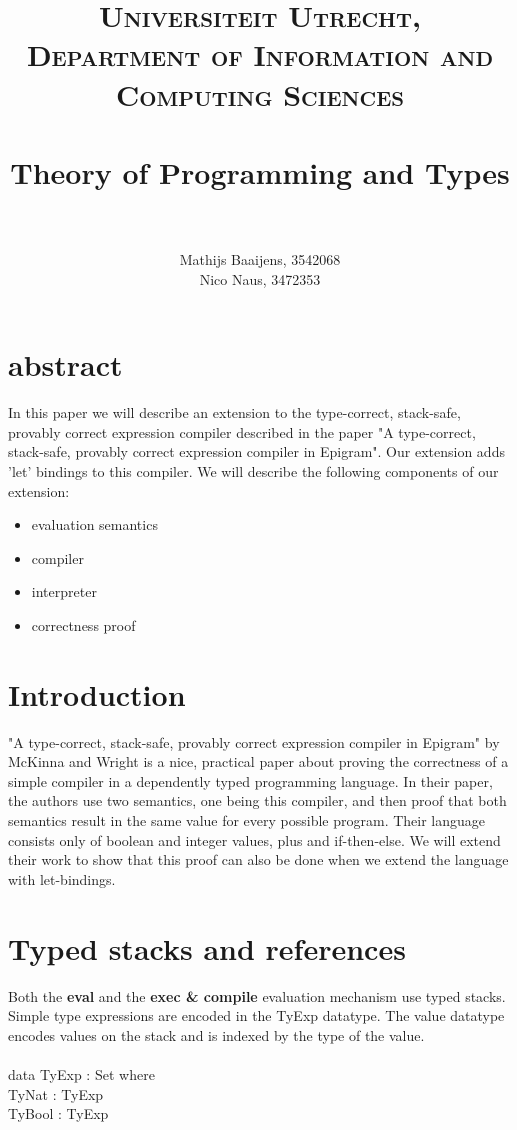 \documentclass[paper=a4, fontsize=11pt]{scrartcl} %
\title{ 
\normalfont \normalsize 
\textsc{Universiteit Utrecht, Department of Information and Computing Sciences} \\ [25pt] %
\horrule{0.5pt} \\[0.4cm] %
\huge Theory of Programming and Types\\ %
\horrule{2pt} \\[0.5cm] %
}
\author{Mathijs Baaijens, 3542068 \\ Nico Naus, 3472353} %
\numberwithin{equation}{section} %
\numberwithin{figure}{section} %
\numberwithin{table}{section} %
\begin{document}
\maketitle %


\section{abstract}
In this paper we will describe an extension to the type-correct, stack-safe, provably correct expression compiler described in the paper "A type-correct, stack-safe, provably correct expression compiler in Epigram". Our extension adds 'let' bindings to this compiler. We will describe the following components of our extension:
\begin{itemize}
\item{evaluation semantics}
\item{compiler}
\item{interpreter}
\item{correctness proof}
\end{itemize}

\section{Introduction}
"A type-correct, stack-safe, provably correct expression compiler in Epigram" by McKinna and Wright is a nice, practical paper about proving the correctness of a simple compiler in a dependently typed programming language. In their paper, the authors use two semantics, one being this compiler, and then proof that both semantics result in the same value for every possible program. Their language consists only of boolean and integer values, plus and if-then-else. We will extend their work to show that this proof can also be done when we extend the language with let-bindings.

\section{Typed stacks and references}
Both the \textbf{eval} and the \textbf{exec \& compile} evaluation mechanism use typed stacks. Simple type expressions are encoded in the \ttfamily TyExp \normalfont datatype. The value datatype encodes values on the stack and is indexed by the type of the value. \\
\\
\ttfamily
data TyExp : Set where\\
\hspace*{5mm}TyNat : TyExp\\
\hspace*{5mm}TyBool : TyExp\\
\end{document}
